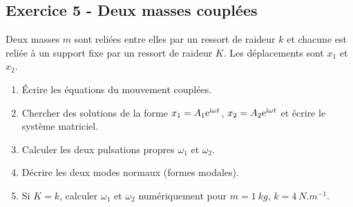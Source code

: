 \documentclass[12pt,a4paper]{article}
\begin{document}
\subsection*{Exercice 5 - Deux masses couplées \niveau{\difficile}}

\begin{boiteexercice}
Deux masses $m$ sont reliées entre elles par un ressort de raideur $k$ et chacune est reliée à un support fixe par un ressort de raideur $K$. Les déplacements sont $x_1$ et $x_2$.
\begin{enumerate}
  \item Écrire les équations du mouvement couplées.
  \item Chercher des solutions de la forme $x_1 = A_1\mathrm{e}^{\mathrm{i}\omega t}$, $x_2 = A_2\mathrm{e}^{\mathrm{i}\omega t}$ et écrire le système matriciel.
  \item Calculer les deux pulsations propres $\omega_1$ et $\omega_2$.
  \item Décrire les deux modes normaux (formes modales).
  \item Si $K=k$, calculer $\omega_1$ et $\omega_2$ numériquement pour $m=\qty{1}{kg}$, $k=\qty{4}{N.m^{-1}}$.
\end{enumerate}
\end{boiteexercice}
\end{document}

